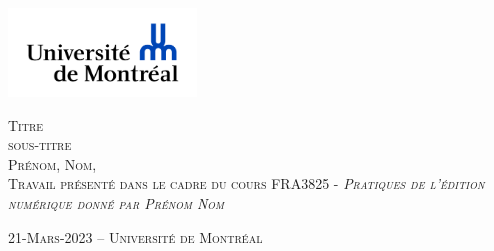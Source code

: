\documentclass[12pt,french,letterpaper]{article}
\subtitle{sous-titre}
\author{Prénom    Nom    Université de Montréal }
\date{}
\begin{document}

\begin{titlepage}%
\begin{center}
    \enlargethispage{2cm}
    
\includegraphics[width = 50mm]{logo} %

\vspace*{3cm}
\scshape\Huge Titre\\
\normalfont\Large sous-titre\\
\large \vspace*{3cm}
Prénom,  Nom,  
\\
\normalsize\vspace*{1cm}Travail présenté dans le cadre du cours FRA3825 - \em Pratiques de l'édition numérique
 \normalfont donné par Prénom Nom 

\vspace*{3cm}
\end{center}

\vspace*{\fill}
\begin{flushright}
\end{flushright}

\begin{center}
\scshape\normalsize\vspace*{1cm} 21-Mars-2023 --      Université de Montréal 
\\
\end{center}
\end{titlepage}




\newpage 
\end{document}
